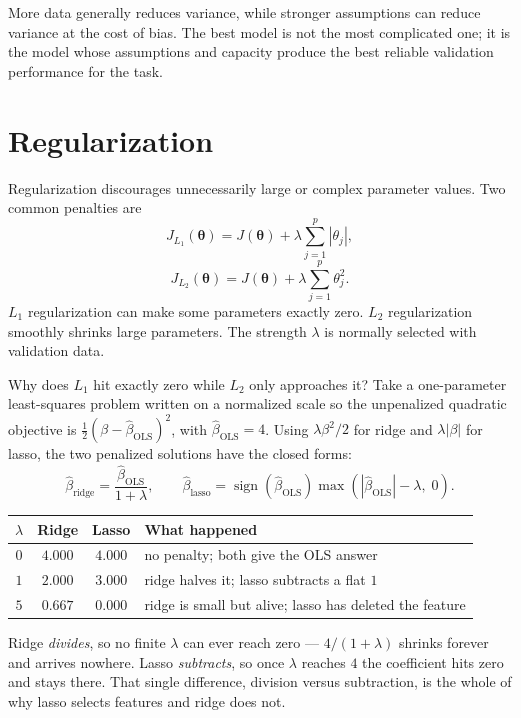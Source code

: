 More data generally reduces variance, while stronger assumptions can reduce variance at the cost of bias. The best model is not the most complicated one; it is the model whose assumptions and capacity produce the best reliable validation performance for the task.

\section{Regularization}

Regularization discourages unnecessarily large or complex parameter values. Two common penalties are
\[
  J_{L_1}(\bm{\theta})=J(\bm{\theta})
  +\lambda\sum_{j=1}^{p}|\theta_j|,
\]
\[
  J_{L_2}(\bm{\theta})=J(\bm{\theta})
  +\lambda\sum_{j=1}^{p}\theta_j^2.
\]
$L_1$ regularization can make some parameters exactly zero. $L_2$ regularization smoothly shrinks large parameters. The strength $\lambda$ is normally selected with validation data.

\begin{workedexample}
Why does $L_1$ hit exactly zero while $L_2$ only approaches it? Take a one-parameter least-squares problem written on a normalized scale so the unpenalized quadratic objective is $\tfrac12(\beta-\hat\beta_{\text{OLS}})^2$, with $\hat{\beta}_{\text{OLS}}=4$. Using $\lambda\beta^2/2$ for ridge and $\lambda|\beta|$ for lasso, the two penalized solutions have the closed forms:
\[
  \hat{\beta}_{\text{ridge}}=\frac{\hat{\beta}_{\text{OLS}}}{1+\lambda},
  \qquad
  \hat{\beta}_{\text{lasso}}=\operatorname{sign}(\hat{\beta}_{\text{OLS}})\max\!\left(|\hat{\beta}_{\text{OLS}}|-\lambda,\;0\right).
\]

\begin{mltable}\small
\begin{tabular}{cccl}
\toprule
\rowcolor{MLPaleBlue!92}
$\lambda$ & Ridge & Lasso & What happened \\
\midrule
$0$ & $4.000$ & $4.000$ & no penalty; both give the OLS answer \\
$1$ & $2.000$ & $3.000$ & ridge halves it; lasso subtracts a flat $1$ \\
$5$ & $0.667$ & $0.000$ & ridge is small but alive; lasso has deleted the feature \\
\bottomrule
\end{tabular}
\end{mltable}

Ridge \emph{divides}, so no finite $\lambda$ can ever reach zero --- $4/(1+\lambda)$ shrinks forever and arrives nowhere. Lasso \emph{subtracts}, so once $\lambda$ reaches $4$ the coefficient hits zero and stays there. That single difference, division versus subtraction, is the whole of why lasso selects features and ridge does not.
\end{workedexample}

